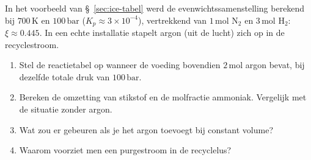 \begin{oefening}
In het voorbeeld van \S~\ref{sec:ice-tabel} werd de evenwichtssamenstelling berekend bij \(700\,\mathrm{K}\) en \(100\,\mathrm{bar}\) (\(K_p \approx 3\times10^{-4}\)), vertrekkend van \(1\,\mathrm{mol}\) \(\mathrm{N_2}\) en \(3\,\mathrm{mol}\) \(\mathrm{H_2}\): \(\xi \approx 0.445\). In een echte installatie stapelt argon (uit de lucht) zich op in de recyclestroom.

\begin{enumerate}
\item[(a)]
  Stel de reactietabel op wanneer de voeding bovendien \(2\,\mathrm{mol}\) argon bevat, bij dezelfde totale druk van \(100\,\mathrm{bar}\).
\item[(b)]
  Bereken de omzetting van stikstof en de molfractie ammoniak. Vergelijk met de situatie zonder argon.
\item[(c)]
  Wat zou er gebeuren als je het argon toevoegt bij constant volume?
\item[(d)]
  Waarom voorziet men een purgestroom in de recyclelus?
\end{enumerate}
\end{oefening}
